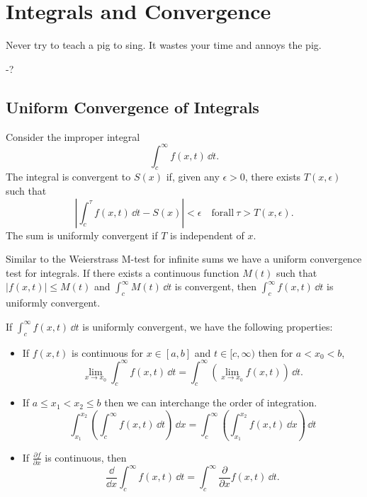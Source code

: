 \flushbottom





\chapter{Integrals and Convergence}



Never try to teach a pig to sing.  It wastes your time and annoys the pig.

\begin{flushright}
  -?
\end{flushright}





\section{Uniform Convergence of Integrals}

Consider the improper integral
\[ \int_c^\infty f(x,t)\,\dd t.\]
The integral is convergent to $S(x)$ if, given any $\epsilon > 0$, there exists
$T(x, \epsilon)$ such that
\[ \left| \int_c^\tau f(x,t)\,\dd t - S(x) \right| < \epsilon \quad 
\mathrm{for all}\ \tau > T(x, \epsilon).\]
The sum is uniformly convergent if $T$ is independent of $x$.

Similar to the Weierstrass M-test for infinite sums we have a uniform
convergence test for integrals. 
If there exists a continuous function $M(t)$ such
that $|f(x,t)| \leq M(t) $ and $\int_c^\infty M(t)\,\dd t$ is convergent,
then $\int_c^\infty f(x,t)\,\dd t$ is uniformly convergent.

If $\int_c^\infty f(x,t)\,\dd t$ is uniformly convergent, we have the following properties:
\begin{itemize}
\item
  If $f(x,t)$ is continuous for $x \in [a,b]$ and $t \in [c,\infty)$ then for
  $a < x_0 < b$,
  \[ \lim_{x \to x_0} \int_c^\infty f(x,t)\,\dd t = 
  \int_c^\infty \left(\lim_{x \to x_0} f(x,t) \right)\,\dd t.\]
\item
  If $a \leq x_1 < x_2 \leq b$ then we can interchange the order of integration.
  \[ \int_{x_1}^{x_2} \left( \int_c^\infty f(x,t)\,\dd t \right)\,\dd x = 
  \int_c^\infty \left(\int_{x_1}^{x_2} f(x,t)\,\dd x\right)\,\dd t\]
\item
  If $\frac{\partial f}{\partial x}$ is continuous, then
  \[ \frac{\dd}{\dd x} \int_c^\infty f(x,t)\,\dd t = \int_c^\infty \frac{\partial}{\partial x}
  f(x,t)\,\dd t.\]
\end{itemize}










